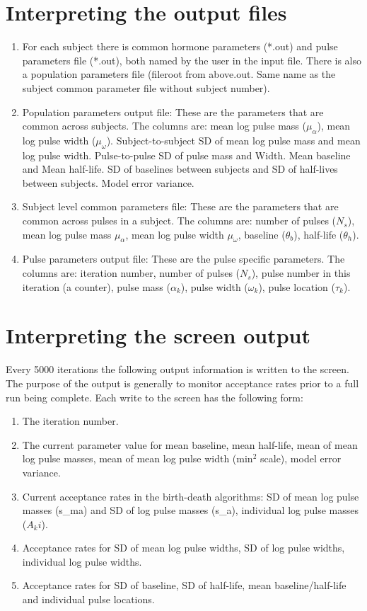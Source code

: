 \documentclass[12pt, oneside]{article}   	%
\begin{document}
\section{Interpreting the output files}
\begin{enumerate}
\item For each subject there is common hormone parameters (*.out) and pulse parameters file (*.out), both named by the user in the input file. There is also a population parameters file (fileroot from above.out. Same name as the subject common parameter file without subject number). 
\item Population parameters output file: These are the parameters that are common across subjects.  The columns are: mean log pulse mass ($\mu_\alpha$), mean log pulse width ($\mu_\omega$). Subject-to-subject SD of mean log pulse mass and mean log pulse width. Pulse-to-pulse SD of pulse mass and Width. Mean baseline and Mean half-life. SD of baselines between subjects and SD of half-lives between subjects. Model error variance.
\item Subject level common parameters file: These are the parameters that are common across pulses in a subject. The columns are: number of pulses ($N_s$), mean log pulse mass $\mu_{\alpha}$, mean log pulse width $\mu_{\omega}$, baseline ($\theta_b$), half-life ($\theta_h$).
\item Pulse parameters output file: These are the pulse specific parameters. The columns are:  iteration number, number of pulses ($N_s$), pulse number in this iteration (a counter), pulse mass ($\alpha_k$), pulse width ($\omega_k$), pulse location ($\tau_k$).
\end{enumerate}

\section{Interpreting the screen output}
Every 5000 iterations the following output information is written to the screen. The purpose of the output is generally to monitor acceptance rates prior to a full run being complete.  Each write to the screen has the following form:
\begin{enumerate}
\item The iteration number.
\item The current parameter value for mean baseline, mean half-life, mean of mean log pulse masses, mean of mean log pulse width (min$^2$ scale),  model error variance.
\item Current acceptance rates in the birth-death algorithms: SD of mean log pulse masses (s\_ma) and SD of log pulse masses (s\_a), individual log pulse masses ($A_ki$).
\item Acceptance rates for SD of mean log pulse widths, SD of log pulse widths, individual log pulse widths.
\item Acceptance rates for SD of baseline, SD of half-life, mean baseline/half-life and individual pulse locations.
\end{enumerate}
\end{document}
